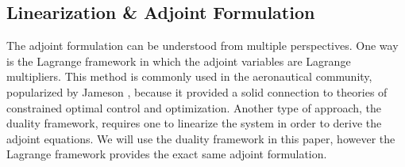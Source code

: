 \subsection{Linearization \& Adjoint Formulation} \label{subsec_adjoint}
The adjoint formulation can be understood from multiple perspectives. One way is the Lagrange framework in which the adjoint variables are Lagrange multipliers. This method is commonly used in the aeronautical community, popularized by Jameson \cite{Jameson1988AerodynamicTheory}, because it provided a solid connection to theories of constrained optimal control and optimization. Another type of approach, the duality framework, requires one to linearize the system in order to derive the adjoint equations. We will use the duality framework in this paper, however the Lagrange framework provides the exact same adjoint formulation. 

